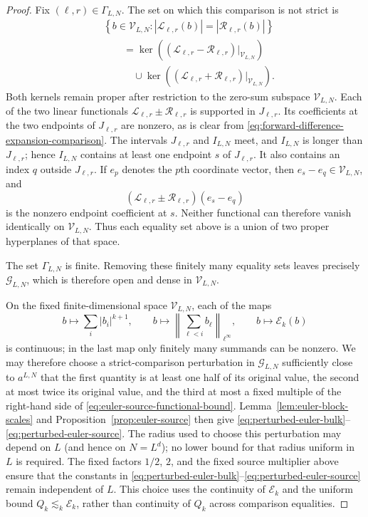 \documentclass[11pt]{amsart}
\theoremstyle{plain}
\theoremstyle{definition}
\theoremstyle{remark}
\numberwithin{equation}{section}
\theoremstyle{plain}
\begin{document}
\begin{proof}
	Fix $(\ell,r)\in\Gamma_{L,N}$.  The set on which this comparison is not
	strict is
	\[
	\begin{aligned}
	&\left\{b\in\mathcal V_{L,N}:
	|\mathcal L_{\ell,r}(b)|=|\mathcal R_{\ell,r}(b)|\right\}\\
	&\qquad=
	\ker\!\left(
	(\mathcal L_{\ell,r}-\mathcal R_{\ell,r})
	\big|_{\mathcal V_{L,N}}\right)\\
	&\qquad\quad\cup
	\ker\!\left(
	(\mathcal L_{\ell,r}+\mathcal R_{\ell,r})
	\big|_{\mathcal V_{L,N}}\right).
	\end{aligned}
	\]
	Both kernels remain proper after restriction to the zero-sum subspace
	$\mathcal V_{L,N}$.  Each of the two linear functionals
	$\mathcal L_{\ell,r}\pm\mathcal R_{\ell,r}$ is supported in
	$J_{\ell,r}$.  Its coefficients at the two endpoints of
	$J_{\ell,r}$ are nonzero, as is clear from
	\eqref{eq:forward-difference-expansion-comparison}.  The intervals
	$J_{\ell,r}$ and $I_{L,N}$ meet, and $I_{L,N}$ is longer than
	$J_{\ell,r}$; hence $I_{L,N}$ contains at least one endpoint $s$ of
	$J_{\ell,r}$.  It also contains an index $q$ outside $J_{\ell,r}$.  If
	$e_p$ denotes the $p$th coordinate vector, then
	$e_s-e_q\in\mathcal V_{L,N}$, and
	\[
	(\mathcal L_{\ell,r}\pm\mathcal R_{\ell,r})(e_s-e_q)
	\]
	is the nonzero endpoint coefficient at $s$.  Neither functional can
	therefore vanish identically on $\mathcal V_{L,N}$.  Thus each equality set
	above is a union of two proper hyperplanes of that space.
	
	The set $\Gamma_{L,N}$ is finite.  Removing these finitely many equality
	sets leaves precisely $\mathcal G_{L,N}$, which is therefore open and dense
	in $\mathcal V_{L,N}$.
	
	On the fixed finite-dimensional space $\mathcal V_{L,N}$, each of the maps
	\[
	b\longmapsto\sum_i|b_i|^{k+1},
	\qquad
	b\longmapsto\left\|\sum_{\ell<i}b_\ell\right\|_{\ell^\infty},
	\qquad
	b\longmapsto\mathcal E_k(b)
	\]
	is continuous; in the last map only finitely many summands can be nonzero.
	We may therefore choose a strict-comparison perturbation
	in $\mathcal G_{L,N}$ sufficiently close to $a^{L,N}$ that the first
	quantity is at least one half
	of its original value, the second at most twice its original value, and the
	third at most a fixed multiple of the right-hand side of
	\eqref{eq:euler-source-functional-bound}.  Lemma~\ref{lem:euler-block-scales}
	and Proposition~\ref{prop:euler-source} then give
	\eqref{eq:perturbed-euler-bulk}--\eqref{eq:perturbed-euler-source}.
	The radius used to choose this perturbation may depend on
	$L$ (and hence on $N=L^d$); no lower bound for that radius uniform in $L$
	is required.  The fixed factors $1/2$, $2$, and the fixed source multiplier
	above ensure that the constants in
	\eqref{eq:perturbed-euler-bulk}--\eqref{eq:perturbed-euler-source} remain
	independent of $L$.
	This choice uses the continuity of $\mathcal E_k$ and the uniform bound
	$Q_k\lesssim_k\mathcal E_k$, rather than continuity of $Q_k$ across
	comparison equalities.
\end{proof}
\end{document}
